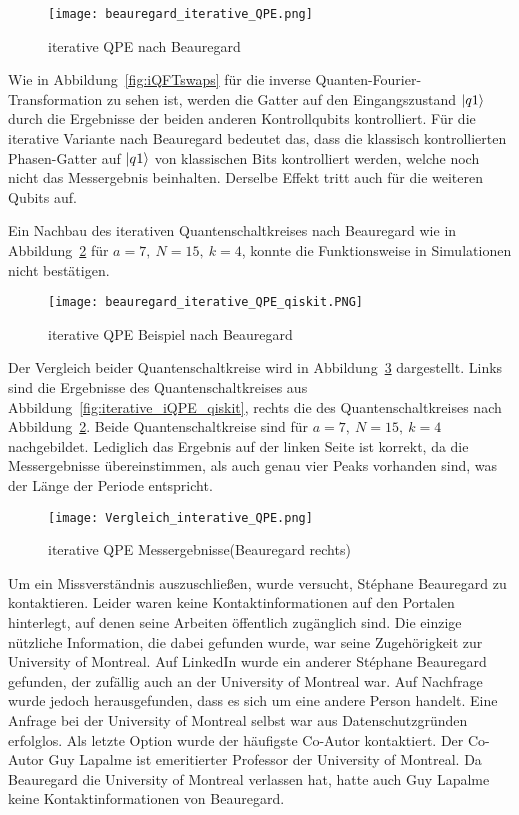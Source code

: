 \begin{figure}[H]
  \centering
  \texttt{[image: beauregard\_iterative\_QPE.png]}
  \caption{iterative QPE nach Beauregard~\cite{beauregard2003circuit}}
  \label{fig:iterative_iQPE_Beauregard}
\end{figure}

Wie in Abbildung~\ref{fig:iQFTswaps} für die inverse Quanten-Fourier-Transformation zu sehen ist, 
werden die Gatter auf den Eingangszustand \(\ket{q1}\) durch die Ergebnisse der beiden anderen Kontrollqubits kontrolliert.
Für die iterative Variante nach Beauregard bedeutet das, 
dass die klassisch kontrollierten Phasen-Gatter auf \(\ket{q1}\) von klassischen Bits kontrolliert werden, 
welche noch nicht das Messergebnis beinhalten.
Derselbe Effekt tritt auch für die weiteren Qubits auf.

Ein Nachbau des iterativen Quantenschaltkreises nach Beauregard wie in Abbildung~\ref{fig:iterative_iQPE_Beauregard_qiskit} für \(a = 7,~N=15,~k=4\), 
konnte die Funktionsweise in Simulationen nicht bestätigen.
\begin{figure}[H]
  \centering
  \texttt{[image: beauregard\_iterative\_QPE\_qiskit.PNG]}
  \caption{iterative QPE Beispiel nach Beauregard}
  \label{fig:iterative_iQPE_Beauregard_qiskit}
\end{figure}
Der Vergleich beider Quantenschaltkreise wird in Abbildung~\ref{fig:iterative_iQPE_Vergleich} dargestellt.
Links sind die Ergebnisse des Quantenschaltkreises aus Abbildung~\ref{fig:iterative_iQPE_qiskit}, 
rechts die des Quantenschaltkreises nach Abbildung~\ref{fig:iterative_iQPE_Beauregard_qiskit}.
Beide Quantenschaltkreise sind für \(a = 7,~N=15,~k=4\) nachgebildet.
Lediglich das Ergebnis auf der linken Seite ist korrekt, 
da die Messergebnisse übereinstimmen, 
als auch genau vier Peaks vorhanden sind, 
was der Länge der Periode entspricht.
\begin{figure}[H]
  \centering
  \texttt{[image: Vergleich\_interative\_QPE.png]}
  \caption{iterative QPE Messergebnisse(Beauregard rechts)}
  \label{fig:iterative_iQPE_Vergleich}
\end{figure}

Um ein Missverständnis auszuschließen, wurde versucht, Stéphane Beauregard zu kontaktieren. 
Leider waren keine Kontaktinformationen auf den Portalen hinterlegt, 
auf denen seine Arbeiten öffentlich zugänglich sind. 
Die einzige nützliche Information, die dabei gefunden wurde, 
war seine Zugehörigkeit zur University of Montreal. 
Auf LinkedIn wurde ein anderer Stéphane Beauregard gefunden, 
der zufällig auch an der University of Montreal war. Auf Nachfrage wurde jedoch herausgefunden, 
dass es sich um eine andere Person handelt. 
Eine Anfrage bei der University of Montreal selbst war aus Datenschutzgründen erfolglos. 
Als letzte Option wurde der häufigste Co-Autor kontaktiert. 
Der Co-Autor Guy Lapalme ist emeritierter Professor der University of Montreal.
Da Beauregard die University of Montreal verlassen hat, 
hatte auch Guy Lapalme keine Kontaktinformationen von Beauregard.

